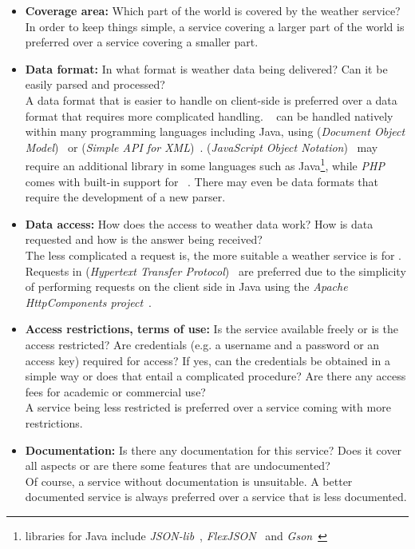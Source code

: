 \begin{itemize}
  \item \textbf{Coverage area:} Which part of the world is covered by the weather service?\\
  In order to keep things simple, a service covering a larger part of the world is preferred over a service covering a smaller part.
  
  \item \textbf{Data format:} In what format is weather data being delivered? Can it be easily parsed and processed?\\
  A data format that is easier to handle on client-side is preferred over a data format that requires more complicated handling. ~\cite{XML} can be handled natively within many programming languages including Java, using  (\emph{Document Object Model})~\cite{DOM} or  (\emph{Simple \acs{API} for \acs{XML}})~\cite{SAX}.  (\emph{JavaScript Object Notation})~\cite{rfc4627} may require an additional library in some languages such as Java\footnote{ libraries for Java include \emph{JSON-lib}~\cite{json-lib}, \emph{FlexJSON}~\cite{flexjson} and \emph{Gson}~\cite{gson}}, while \emph{PHP} comes with built-in support for ~\cite{php-json}. There may even be data formats that require the development of a new parser.
  
  \item \textbf{Data access:} How does the access to weather data work? How is data requested and how is the answer being received?\\
  The less complicated a request is, the more suitable a weather service is for \smarthomeweather. Requests in  (\emph{Hypertext Transfer Protocol})~\cite{rfc2616} are preferred due to the simplicity of performing requests on the client side in Java using the \emph{Apache HttpComponents project}~\cite{apache_hc}.
  
  \item \textbf{Access restrictions, terms of use:} Is the service available freely or is the access restricted? Are credentials (e.g. a username and a password or an access key) required for access? If yes, can the credentials be obtained in a simple way or does that entail a complicated procedure? Are there any access fees for academic or commercial use?\\
  A service being less restricted is preferred over a service coming with more restrictions.
  
  \item \textbf{Documentation:} Is there any documentation for this service? Does it cover all aspects or are there some features that are undocumented?\\
  Of course, a service without documentation is unsuitable. A better documented service is always preferred over a service that is less documented.
  

\end{itemize}
